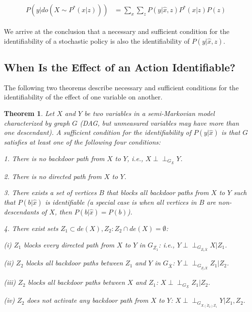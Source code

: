 \documentclass[fleqn]{article}
\newcommand{\independent}{\perp \!\!\! \perp}
\newtheorem{theorem}{Theorem}
\numberwithin{equation}{section}
\numberwithin{theorem}{section}
\numberwithin{figure}{section}
\numberwithin{lemma}{section}
\numberwithin{corollary}{section}
\begin{document}
\begin{align}
	\begin{split}
		P(y|do(X \sim P^*(x|z))) &= \sum\limits_{x}\sum\limits_{z}P(y|\hat x,z)P^*(x|z)P(z)
	\end{split}
\end{align}

We arrive at the conclusion that a necessary and sufficient condition for the identifiability of a stochastic policy is also the identifiability of $P(y|\hat x, z)$.

\subsection*{When Is the Effect of an Action Identifiable?}

The following two theorems describe necessary and sufficient conditions for the identifiability of the effect of one variable on another.

\begin{theorem}
	\label{th:sufficient_identify}
	Let $X$ and $Y$ be two variables in a semi-Markovian model characterized by graph $G$ (DAG, but unmeasured variables may have more than one descendant). A sufficient condition for the identifiability of $P(y|\hat x)$ is that $G$ satisfies at least one of the following four conditions:
	
	1. There is no backdoor path from $X$ to $Y$, i.e., $X \independent_{G_{\underline{X}}} Y$.
	
	2. There is no directed path from $X$ to $Y$.
	
	3. There exists a set of vertices $B$ that blocks all backdoor paths from $X$ to $Y$ such that $P(b|\hat x)$ is identifiable (a special case is when all vertices in $B$ are non-descendants of $X$, then $P(b|\hat x) = P(b)$).
	
	4. There exist sets $Z_1 \subset de(X), Z_2: Z_2 \cap de(X) = \emptyset$:
	
	(i) $Z_1$ blocks every directed path from $X$ to $Y$ in $G_{\overline{Z_1}}$: i.e., $Y \independent_{G_{\overline{Z_1}\overline{X}}} X | Z_1$.
	
	(ii) $Z_2$ blocks all backdoor paths between $Z_1$ and $Y$ in $G_{\overline{X}}$: $Y \independent_{G_{\underline{Z_1}\overline{X}}} Z_1 | Z_2$.
	
	(iii) $Z_2$ blocks all backdoor paths between $X$ and $Z_1$: $X \independent_{G_{\underline{X}}} Z_1 | Z_2$.
	
	(iv) $Z_2$ does not activate any backdoor path from $X$ to $Y$: $X \independent_{G_{\overline{X(Z_2)} \overline{Z_1}}} Y | Z_1, Z_2$.
\end{theorem}
\end{document}
